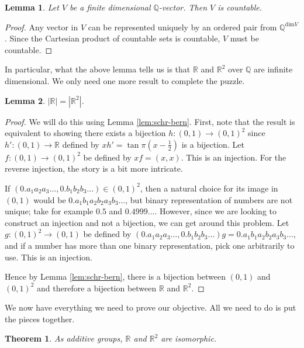 \documentclass[12pt]{article}
\newtheorem*{theorem}{Theorem}
\newtheorem{lemma}{Lemma}
\begin{document}
  \begin{lemma}
    \label{lem:vs-q-count}
    Let $V$ be a finite dimensional $\mathbb{Q}$-vector. Then $V$ is countable.
  \end{lemma}
  
  \begin{proof}
    Any vector in $V$ can be represented uniquely by an ordered pair from $\mathbb{Q}^{\text{dim}V}$. Since the Cartesian product of countable sets is countable, $V$ must be countable.
  \end{proof}

  In particular, what the above lemma tells us is that $\mathbb{R}$ and $\mathbb{R}^2$ over $\mathbb{Q}$ are infinite dimensional. We only need one more result to complete the puzzle.

  \begin{lemma}
    \label{lem:r-r2-card}
    $|\mathbb{R}|=|\mathbb{R}^2|$.
  \end{lemma}

  \begin{proof}
    We will do this using Lemma \ref{lem:schr-bern}. First, note that the result is equivalent to showing there exists a bijection $h:(0,1)\to (0,1)^2$ since $h':(0,1)\to\mathbb{R}$ defined by $xh'=\tan{\pi(x-\frac{1}{2})}$ is a bijection. Let $f:(0,1)\to (0,1)^2$ be defined by $xf=(x,x)$. This is an injection. For the reverse injection, the story is a bit more intricate.
    
    If $(0.a_1a_2a_3\ldots,0.b_1b_2b_3\ldots)\in (0,1)^2$, then a natural choice for its image in $(0,1)$ would be $0.a_1b_1a_2b_2a_3b_3\ldots$, but binary representation of numbers are not unique; take for example $0.5$ and $0.4999\ldots$. However, since we are looking to construct an injection and not a bijection, we can get around this problem. Let $g:(0,1)^2\to (0,1)$ be defined by $(0.a_1a_2a_3\ldots,0.b_1b_2b_3\ldots)g = 0.a_1b_1a_2b_2a_3b_3\ldots$, and if a number has more than one binary representation, pick one arbitrarily to use. This is an injection.

    Hence by Lemma \ref{lem:schr-bern}, there is a bijection between $(0,1)$ and $(0,1)^2$ and therefore a bijection between $\mathbb{R}$ and $\mathbb{R}^2$.
  \end{proof}

  We now have everything we need to prove our objective. All we need to do is put the pieces together.

  \begin{theorem}
    As additive groups, $\mathbb{R}$ and $\mathbb{R}^2$ are isomorphic.
  \end{theorem}
\end{document}
